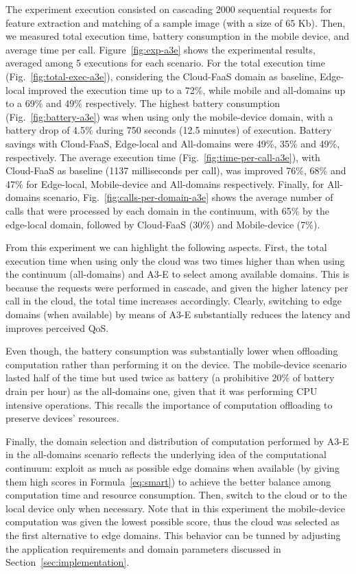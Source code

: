
The experiment execution consisted on cascading 2000 sequential requests for feature extraction and matching of a sample image (with a size of 65 Kb). Then, we measured total execution time, battery consumption in the mobile device, and average time per call. Figure~\ref{fig:exp-a3e} shows the experimental results, averaged among 5 executions for each scenario.
 For the total execution time (Fig.~\ref{fig:total-exec-a3e}), considering the Cloud-FaaS domain as baseline, Edge-local improved the execution time up to a 72\%, while mobile and all-domains up to a 69\%  and 49\% respectively. The highest battery consumption (Fig.~\ref{fig:battery-a3e}) was when using only the mobile-device domain, with a battery drop of 4.5\% during 750 seconds (12.5 minutes) of execution. Battery savings with Cloud-FaaS, Edge-local and All-domains were 49\%, 35\% and 49\%, respectively. The average execution time (Fig.~\ref{fig:time-per-call-a3e}), with Cloud-FaaS as baseline (1137 milliseconds per call), was improved 76\%, 68\% and 47\% for Edge-local, Mobile-device and All-domains respectively. Finally, for All-domains scenario, Fig.~\ref{fig:calls-per-domain-a3e} shows the average number of calls that were processed by each domain in the continuum, with 65\% by the edge-local domain, followed by Cloud-FaaS (30\%) and Mobile-device (7\%).
 
From this experiment we can highlight the following aspects. First, the total execution time when using only the cloud was two times higher than when using the continuum (all-domains) and A3-E to select among available domains. This is because the requests were performed in cascade, and given the higher latency per call in the cloud, the total time increases accordingly. Clearly, switching to edge domains (when available) by means of A3-E substantially reduces the latency and improves perceived QoS.

Even though, the battery consumption was substantially lower when offloading computation rather than performing it on the device. The mobile-device scenario lasted half of the time but used twice as battery (a prohibitive 20\% of battery drain per hour) as the all-domains one, given that it was performing CPU intensive operations. This recalls the importance of computation offloading to preserve devices' resources.

Finally, the domain selection and distribution of computation performed by A3-E in the all-domains scenario reflects the underlying idea of the computational continuum: exploit as much as possible edge domains when available (by giving them high scores in Formula~\ref{eq:smart}) to achieve the better balance among computation time and resource consumption. Then, switch to the cloud or to the local device only when necessary. Note that in this experiment the mobile-device computation was given the lowest possible score, thus the cloud was selected as the first alternative to edge domains. This behavior can be tunned by adjusting the application requirements and domain parameters discussed in Section~\ref{sec:implementation}.


